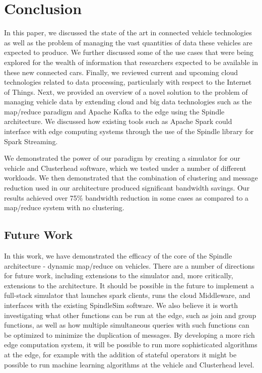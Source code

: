 \documentclass{thesis}
\begin{document}
\chapter{Conclusion}
    In this paper, we discussed the state of the art in connected vehicle technologies as well as the problem
    of managing the vast quantities of data these vehicles are expected to produce. We further discussed
    some of the use cases that were being explored for the wealth of information that researchers expected
    to be available in these new connected cars. Finally, we reviewed current and upcoming cloud technologies
    related to data processing, particularly with respect to the Internet of Things. Next, we provided an
    overview of a novel solution to the problem of managing vehicle data by extending cloud and big data 
    technologies such as the map/reduce paradigm and Apache Kafka to the edge using the Spindle architecture.
    We discussed how existing tools such as Apache Spark could interface with edge computing systems through
    the use of the Spindle library for Spark Streaming.

    We demonstrated the power of our paradigm by creating a simulator for our vehicle and Clusterhead software,
    which we tested under a number of different workloads. We then demonstrated that the combination of clustering
    and message reduction used in our architecture produced significant bandwidth savings. Our results achieved
    over 75\% bandwidth reduction in some cases as compared to a map/reduce system with no clustering.

\section*{Future Work}
    In this work, we have demonstrated the efficacy of the core of the Spindle architecture - dynamic map/reduce
    on vehicles. There are a number of directions for future work, including extensions to the simulator and, 
    more critically, extensions to the architecture.
    It should be possible in the future to implement a full-stack simulator that launches spark clients, runs
    the cloud Middleware, and interfaces with the existing SpindleSim software. We also believe it is worth
    investigating what other functions can be run at the edge, such as join and group functions, as well
    as how multiple simultaneous queries with such functions can be optimized to minimize the duplication
    of messages. By developing a more rich edge computation system, it will be possible to run more sophisticated
    algorithms at the edge, for example with the addition of stateful operators it might be possible to run
    machine learning algorithms at the vehicle and Clusterhead level.
\end{document}
